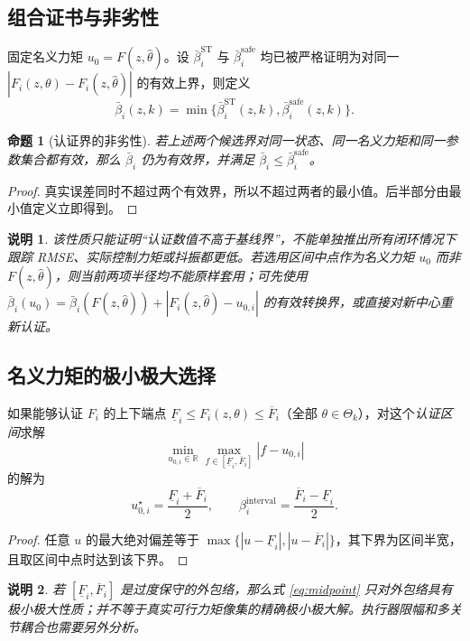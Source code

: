 \documentclass[journal,onecolumn]{IEEEtran}
\newtheorem{proposition}{命题}[section]
\newtheorem{remark}{说明}[section]
\newcommand{\R}{\mathbb R}
\newcommand{\abs}[1]{\left\lvert#1\right\rvert}
\begin{document}
\subsection{组合证书与非劣性}
固定名义力矩 $u_0=F(z,\hat\theta)$。设 $\bar\beta_i^{\mathrm{ST}}$ 与 $\bar\beta_i^{\mathrm{safe}}$ 均已被严格证明为对同一 $|F_i(z,\theta)-F_i(z,\hat\theta)|$ 的有效上界，则定义
\begin{equation}
 \boxed{\bar\beta_i(z,k)=\min\{\bar\beta_i^{\mathrm{ST}}(z,k),\bar\beta_i^{\mathrm{safe}}(z,k)\}.}
 \label{eq:minbound}
\end{equation}
\begin{proposition}[认证界的非劣性]
若上述两个候选界对同一状态、同一名义力矩和同一参数集合都有效，那么 $\bar\beta_i$ 仍为有效界，并满足 $\bar\beta_i\le\bar\beta_i^{\mathrm{safe}}$。
\end{proposition}
\begin{proof}
真实误差同时不超过两个有效界，所以不超过两者的最小值。后半部分由最小值定义立即得到。
\end{proof}
\begin{remark}
该性质只能证明“认证数值不高于基线界”，\emph{不能单独推出}所有闭环情况下跟踪 RMSE、实际控制力矩或抖振都更低。若选用区间中点作为名义力矩 $u_0$ 而非 $F(z,\hat\theta)$，则当前两项半径均不能原样套用；可先使用 $\bar\beta_i(u_0) = \bar\beta_i(F(z,\hat\theta)) + |F_i(z,\hat\theta)-u_{0,i}|$ 的有效转换界，或直接对新中心重新认证。
\end{remark}

\subsection{名义力矩的极小极大选择}
如果能够认证 $F_i$ 的上下端点 $\underline F_i\le F_i(z,\theta)\le\overline F_i$（全部 $\theta\in\Theta_k$），对这个\emph{认证区间}求解
\begin{equation}
 \min_{u_{0,i}\in\R}\max_{f\in[\underline F_i,\overline F_i]}\abs{f-u_{0,i}}
\end{equation}
的解为
\begin{equation}
 \boxed{u_{0,i}^\star=\frac{\underline F_i+\overline F_i}{2},\qquad
 \beta_i^{\mathrm{interval}}=\frac{\overline F_i-\underline F_i}{2}.}
 \label{eq:midpoint}
\end{equation}
\begin{proof}
任意 $u$ 的最大绝对偏差等于 $\max\{|u-\underline F_i|,|u-\overline F_i|\}$，其下界为区间半宽，且取区间中点时达到该下界。
\end{proof}
\begin{remark}
若 $[\underline F_i,\overline F_i]$ 是过度保守的外包络，那么式 \eqref{eq:midpoint} 只对外包络具有极小极大性质；并不等于真实可行力矩像集的精确极小极大解。执行器限幅和多关节耦合也需要另外分析。
\end{remark}
\end{document}
